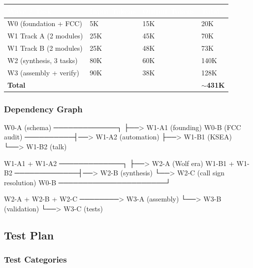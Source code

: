 \documentclass[11pt,letterpaper]{article}
\newcommand{\tableheader}[1]{\textbf{\sffamily\textcolor{white}{#1}}}
\begin{document}
\begin{center}
\begin{tabularx}{\textwidth}{XC{2cm}C{2cm}C{2cm}}
\toprule
{}
\tableheader{Wave / Task} & \tableheader{Input Tokens} & \tableheader{Output Tokens} & \tableheader{Total} \\
\midrule
W0 (foundation + FCC) & 5K & 15K & 20K \\
W1 Track A (2 modules) & 25K & 45K & 70K \\
W1 Track B (2 modules) & 25K & 48K & 73K \\
W2 (synthesis, 3 tasks) & 80K & 60K & 140K \\
W3 (assembly + verify) & 90K & 38K & 128K \\
\midrule
\textbf{Total} & & & \textbf{$\sim$431K} \\
\bottomrule
\end{tabularx}
\end{center}

\subsubsection{Dependency Graph}

\begin{asciibox}
W0-A (schema) ─────────────┐
                           ├──> W1-A1 (founding)
W0-B (FCC audit) ──────────┤──> W1-A2 (automation)
                           ├──> W1-B1 (KSEA)
                           └──> W1-B2 (talk)

W1-A1 + W1-A2 ─────────────┐
                           ├──> W2-A (Wolf era)
W1-B1 + W1-B2 ─────────────┤──> W2-B (synthesis)
                           └──> W2-C (call sign resolution)
W0-B ──────────────────────┘

W2-A + W2-B + W2-C ────────> W3-A (assembly)
                              └──> W3-B (validation)
                                   └──> W3-C (tests)
\end{asciibox}

\subsection{Test Plan}

\subsubsection{Test Categories}
\end{document}
